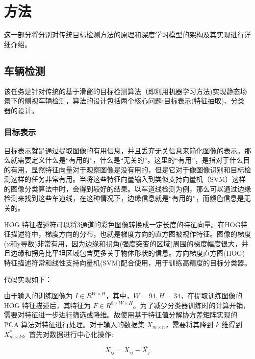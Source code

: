 \section{方法} 
\label{sec:proposed}

这一部分将分别对传统目标检测方法的原理和深度学习模型的架构及其实现进行详细介绍。

\subsection{车辆检测}

该任务是针对传统的基于滑窗的目标检测算法（即利用机器学习方法)实现静态场景下的侧视车辆检测，算法的设计包括两个核心问题:目标表示(特征抽取)、分类器的设计。

\subsubsection{目标表示}
目标表示就是通过提取图像的有用信息，并且丢弃无关信息来简化图像的表示。那么就需要定义什么是“有用的”，什么是“无关的”。这里的“有用”，是指对于什么目的有用，显然特征向量对于观察图像是没有用的，但是它对于像图像识别和目标检测这样的任务非常有用。当将这些特征向量输入到类似支持向量机（SVM）这样的图像分类算法中时，会得到较好的结果。以车道线检测为例，那么可以通过边缘检测来找到这些车道线，在这种情况下，边缘信息就是“有用的”，而颜色信息是无关的。

HOG 特征描述符可以将3通道的彩色图像转换成一定长度的特征向量。在HOG特征描述符中，梯度方向的分布，也就是梯度方向的直方图被视作特征。图像的梯度(x和y导数)非常有用，因为边缘和拐角(强度突变的区域)周围的梯度幅度很大，并且边缘和拐角比平坦区域包含更多关于物体形状的信息。方向梯度直方图(HOG)特征描述符常和线性支持向量机(SVM)配合使用，用于训练高精度的目标分类器。

代码实现如下：

\vspace{0.3cm}


由于输入的训练图像为 $I \in R^{W \times H}$，其中，$W=94, H=34$，在提取训练图像的 HOG 特征描述后，其特征为 $F \in R^{8\times W \times H}$。为了减少分类器训练时的计算开销，需要对特征进一步进行筛选或降维。故使用基于特征值分解协方差矩阵实现的 PCA 算法对特征进行处理。对于输入的数据集 $X_{m\times n}$，需要将其降到 $k$ 维得到 $X^*_{m\times k}$。首先对数据进行中心化操作:

\begin{equation}
X_{i j}=X_{i j}-\overline{X_j}
\end{equation}

